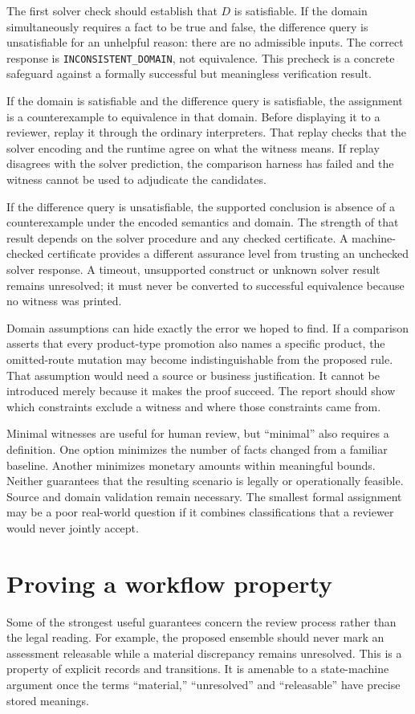 \documentclass[12pt,a4paper,oneside,openany]{book}
\begin{document}
The first solver check should establish that $D$ is satisfiable. If the domain
simultaneously requires a fact to be true and false, the difference query is
unsatisfiable for an unhelpful reason: there are no admissible inputs. The
correct response is \texttt{INCONSISTENT\_DOMAIN}, not equivalence. This
precheck is a concrete safeguard against a formally successful but meaningless
verification result.

If the domain is satisfiable and the difference query is satisfiable, the
assignment is a counterexample to equivalence in that domain. Before displaying
it to a reviewer, replay it through the ordinary interpreters. That replay
checks that the solver encoding and the runtime agree on what the witness
means. If replay disagrees with the solver prediction, the comparison harness
has failed and the witness cannot be used to adjudicate the candidates.

If the difference query is unsatisfiable, the supported conclusion is absence
of a counterexample under the encoded semantics and domain. The strength of
that result depends on the solver procedure and any checked certificate. A
machine-checked certificate provides a different assurance level from trusting
an unchecked solver response. A timeout, unsupported construct or unknown
solver result remains unresolved; it must never be converted to successful
equivalence because no witness was printed.

Domain assumptions can hide exactly the error we hoped to find. If a comparison
asserts that every product-type promotion also names a specific product, the
omitted-route mutation may become indistinguishable from the proposed rule.
That assumption would need a source or business justification. It cannot be
introduced merely because it makes the proof succeed. The report should show
which constraints exclude a witness and where those constraints came from.

Minimal witnesses are useful for human review, but ``minimal'' also requires a
definition. One option minimizes the number of facts changed from a familiar
baseline. Another minimizes monetary amounts within meaningful bounds. Neither
guarantees that the resulting scenario is legally or operationally feasible.
Source and domain validation remain necessary. The smallest formal assignment
may be a poor real-world question if it combines classifications that a reviewer
would never jointly accept.

\section{Proving a workflow property}
\label{sec:proof-workflow}
Some of the strongest useful guarantees concern the review process rather than
the legal reading. For example, the proposed ensemble should never mark an
assessment releasable while a material discrepancy remains unresolved. This is
a property of explicit records and transitions. It is amenable to a state-machine
argument once the terms ``material,'' ``unresolved'' and ``releasable'' have
precise stored meanings.
\end{document}

